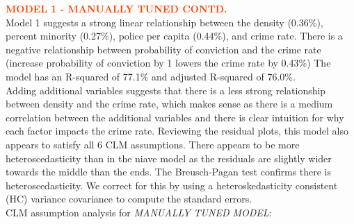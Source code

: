 \pagebreak

\textbf{\textcolor{OrangeRed}{MODEL 1 - MANUALLY TUNED CONTD.}}\\

Model 1 suggests a strong linear relationship between the density (0.36\%), percent minority (0.27\%), police per capita (0.44\%), and crime rate. There is a negative relationship between probability of conviction and the crime rate (increase probability of conviction by 1 lowers the crime rate by 0.43\%) The model has an R-squared of 77.1\% and adjusted R-squared of 76.0\%. \\

Adding additional variables suggests that there is a less strong relationship between density and the crime rate, which makes sense as there is a medium correlation between the additional variables and there is clear intuition for why each factor impacts the crime rate. Reviewing the residual plots, this model also appears to satisfy all 6 CLM assumptions. There appears to be more heteroscedasticity than in the niave model as the residuals are slightly wider towards the middle than the ends. The Breusch-Pagan test confirms there is heteroscedasticity. We correct for this by using a heteroskedasticity consistent (HC) variance covariance to compute the standard errors. \\

CLM assumption analysis for \textit{MANUALLY TUNED MODEL}:
\label{sec:ManualModelCLM}

